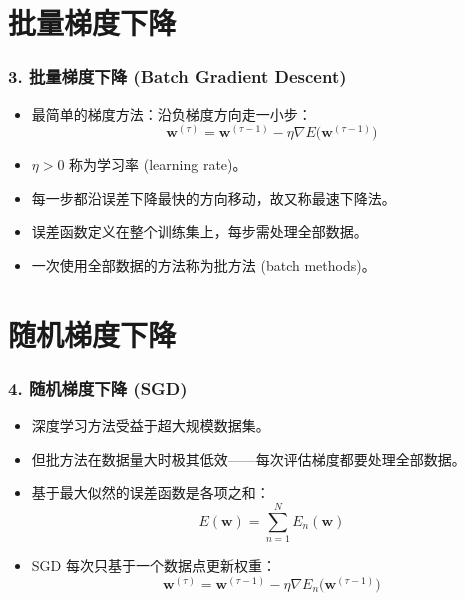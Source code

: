 \documentclass[t,aspectratio=169]{beamer} %
\begin{document}
\section{批量梯度下降}

\begin{frame}
    \frametitle{3. 批量梯度下降 (Batch Gradient Descent)}
    \begin{itemize}
        \item 最简单的梯度方法：沿\alert{负梯度方向}走一小步：
        \begin{equation}
        \mathbf{w}^{(\tau)} = \mathbf{w}^{(\tau-1)} - \eta \nabla E\bigl(\mathbf{w}^{(\tau-1)}\bigr)
        \tag{7.16}
        \end{equation}
        \item $\eta > 0$ 称为\alert{学习率 (learning rate)}。
        \item 每一步都沿误差下降最快的方向移动，故又称\alert{最速下降法}。
        \item 误差函数定义在\alert{整个训练集}上，每步需处理全部数据。
        \item 一次使用全部数据的方法称为\alert{批方法 (batch methods)}。
    \end{itemize}
\end{frame}

\section{随机梯度下降}

\begin{frame}
    \frametitle{4. 随机梯度下降 (SGD)}
    \begin{itemize}
        \item 深度学习方法受益于\alert{超大规模数据集}。
        \item 但批方法在数据量大时\alert{极其低效}——每次评估梯度都要处理全部数据。
        \item 基于最大似然的误差函数是\alert{各项之和}：
        \begin{equation}
        E(\mathbf{w}) = \sum_{n=1}^{N} E_n(\mathbf{w})
        \tag{7.17}
        \end{equation}
        \item SGD 每次只基于\alert{一个数据点}更新权重：
        \begin{equation}
        \mathbf{w}^{(\tau)} = \mathbf{w}^{(\tau-1)} - \eta \nabla E_n\bigl(\mathbf{w}^{(\tau-1)}\bigr)
        \tag{7.18}
        \end{equation}
    \end{itemize}
\end{frame}
\end{document}
